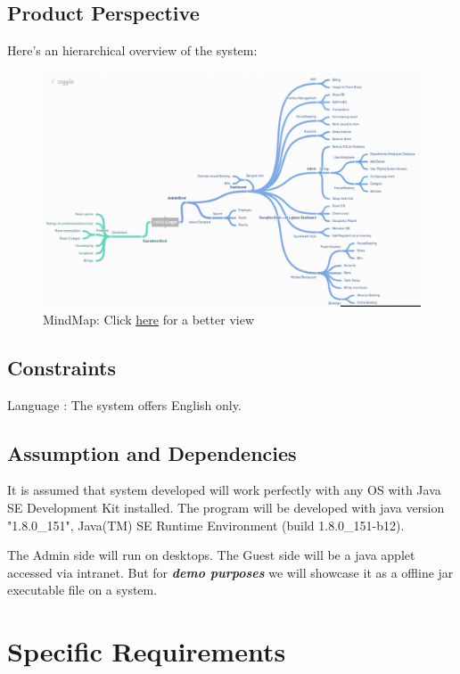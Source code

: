 \documentclass{scrreprt}
\begin{document}
\section{Product Perspective}
Here's an hierarchical overview of the system: \\
\begin{figure}
\includegraphics[scale=0.45]{mindMap}
\caption{MindMap: Click \href{https://coggle.it/diagram/Wlym2xSXOQABLTqA/t/hms-login/f320d49deb338a9cf58b394d26363a45f19cc220db5853f8cb725671b8958ee9}{here} for a better view}
\end{figure}



\section{Constraints}
Language : The system offers English only.

\section{Assumption and Dependencies}
It is assumed that system developed will work perfectly with any OS with Java SE Development Kit installed. The program will be developed with java version "1.8.0_151", 
Java(TM) SE Runtime Environment (build 1.8.0_151-b12).

The Admin side will run on desktops.
The Guest side will be a java applet accessed via intranet. But for \textbf{\textit{demo purposes}} we will showcase it as a offline jar executable file on a system.


\chapter{Specific Requirements}
\end{document}
